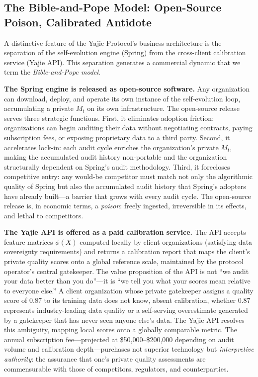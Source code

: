 \documentclass[12pt,a4paper]{ctexart}
\theoremstyle{definition}
\theoremstyle{remark}
\begin{document}
\subsection{The Bible-and-Pope Model: Open-Source Poison, Calibrated Antidote}

A distinctive feature of the Yajie Protocol's business architecture is the separation of the self-evolution engine (Spring) from the cross-client calibration service (Yajie API). This separation generates a commercial dynamic that we term the \textit{Bible-and-Pope model}.

\textbf{The Spring engine is released as open-source software.} Any organization can download, deploy, and operate its own instance of the self-evolution loop, accumulating a private $M_t$ on its own infrastructure. The open-source release serves three strategic functions. First, it eliminates adoption friction: organizations can begin auditing their data without negotiating contracts, paying subscription fees, or exposing proprietary data to a third party. Second, it accelerates lock-in: each audit cycle enriches the organization's private $M_t$, making the accumulated audit history non-portable and the organization structurally dependent on Spring's audit methodology. Third, it forecloses competitive entry: any would-be competitor must match not only the algorithmic quality of Spring but also the accumulated audit history that Spring's adopters have already built—a barrier that grows with every audit cycle. The open-source release is, in economic terms, a \textit{poison}: freely ingested, irreversible in its effects, and lethal to competitors.

\textbf{The Yajie API is offered as a paid calibration service.} The API accepts feature matrices $\phi(X)$ computed locally by client organizations (satisfying data sovereignty requirements) and returns a calibration report that maps the client's private quality scores onto a global reference scale, maintained by the protocol operator's central gatekeeper. The value proposition of the API is not ``we audit your data better than you do''—it is ``we tell you what your scores mean relative to everyone else.'' A client organization whose private gatekeeper assigns a quality score of 0.87 to its training data does not know, absent calibration, whether 0.87 represents industry-leading data quality or a self-serving overestimate generated by a gatekeeper that has never seen anyone else's data. The Yajie API resolves this ambiguity, mapping local scores onto a globally comparable metric. The annual subscription fee—projected at \$50,000–\$200,000 depending on audit volume and calibration depth—purchases not superior technology but \textit{interpretive authority}: the assurance that one's private quality assessments are commensurable with those of competitors, regulators, and counterparties.
\end{document}
